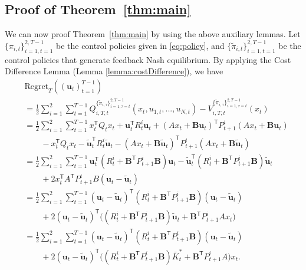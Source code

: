 \documentclass[letterpaper, 10 pt, conference]{ieeeconf}  %
\newcommand{\contTilde}[1]{\mathbf{\tilde{#1}}}
\newcommand{\transpose}{\mathsf{T}}
\begin{document}
\subsection{Proof of Theorem~\ref{thm:main}}
We can now proof Theorem~\ref{thm:main} by using the above auxiliary lemmas.
Let $\{\pi_{i,t}\}_{i=1,t=1}^{2,T-1}$ be the control policies given in \eqref{eq:policy}, and $\{\tilde{\pi}_{i,t}\}_{i=1,t=1}^{2,T-1}$ be the control policies that generate feedback Nash equilibrium.
By applying the Cost Difference Lemma (Lemma \ref{lemma:costDifference}), we have
\begin{align*}
    &\text{Regret}_{T}((\mathbf{u}_{t})_{t=1}^{T-1})\\
    &= \frac{1}{2}\sum_{i=1}^{2}\sum_{t=1}^{T-1} Q_{i,T,t}^{\{\tilde{\pi}_{i,\tau}\}_{i=1,\tau=t}^{2,T-1}}(x_{t},u_{1,t},...,u_{N,t}) -  V_{i,T,t}^{\{\tilde{\pi}_{i,\tau}\}_{i=1,\tau=t}^{2,T-1}}(x_{t})\\
    &= \frac{1}{2}\sum_{i=1}^{2}\sum_{t=1}^{T-1} x_{t}^{\transpose}Q_{t}x_{t} + \mathbf{u}_{t}^{\transpose}R_{t}^{i}\mathbf{u}_{t} + (Ax_{t}+\mathbf{B}\mathbf{u}_{t})^{\transpose}P_{t+1}^{i}(Ax_{t}+\mathbf{B}\mathbf{u}_{t})\\
    &\qquad - x_{t}^{\transpose}Q_{t}x_{t} - \contTilde{u}_{t}^{\transpose}R_{t}^{i}\contTilde{u}_{t} - (Ax_{t}+\mathbf{B}\contTilde{u}_{t})^{\transpose}P_{t+1}^{i}(Ax_{t}+\mathbf{B}\contTilde{u}_{t})\\
    &= \frac{1}{2}\sum_{i=1}^{2}\sum_{t=1}^{T-1} \mathbf{u}_{t}^{\transpose}(R_{t}^{i}+\mathbf{B}^{\transpose}P_{t+1}^{i}\mathbf{B})\mathbf{u}_{t}-\contTilde{u}_{t}^{\transpose}(R_{t}^{i}+\mathbf{B}^{\transpose}P_{t+1}^{i}\mathbf{B})\contTilde{u}_{t} \\
    &\qquad+ 2x_{t}^{\transpose}A^{\transpose}P_{t+1}^{i}B(\mathbf{u}_{t}-\contTilde{u}_{t})\\
    &= \frac{1}{2}\sum_{i=1}^{2}\sum_{t=1}^{T-1} (\mathbf{u}_{t}-\contTilde{u}_{t})^{\transpose}(R_{t}^{i}+\mathbf{B}^{\transpose}P_{t+1}^{i}\mathbf{B})(\mathbf{u}_{t}-\contTilde{u}_{t})\\
    &\qquad + 2(\mathbf{u}_{t}-\contTilde{u}_{t})^{\transpose}\bigg((R_{t}^{i}+\mathbf{B}^{\transpose}P_{t+1}^{i}\mathbf{B})\contTilde{u}_{t}+\mathbf{B}^{\transpose}P_{t+1}^{i}Ax_{t}\bigg)\\
    &= \frac{1}{2}\sum_{i=1}^{2}\sum_{t=1}^{T-1} (\mathbf{u}_{t}-\contTilde{u}_{t})^{\transpose}(R_{t}^{i}+\mathbf{B}^{\transpose}P_{t+1}^{i}\mathbf{B})(\mathbf{u}_{t}-\contTilde{u}_{t})\\
    &\qquad + 2(\mathbf{u}_{t}-\contTilde{u}_{t})^{\transpose}\bigg((R_{t}^{i}+\mathbf{B}^{\transpose}P_{t+1}^{i}\mathbf{B})\bar{K}_{t}^{*}+\mathbf{B}^{\transpose}P_{t+1}^{i}A\bigg)x_{t}.
\end{align*}
\end{document}
